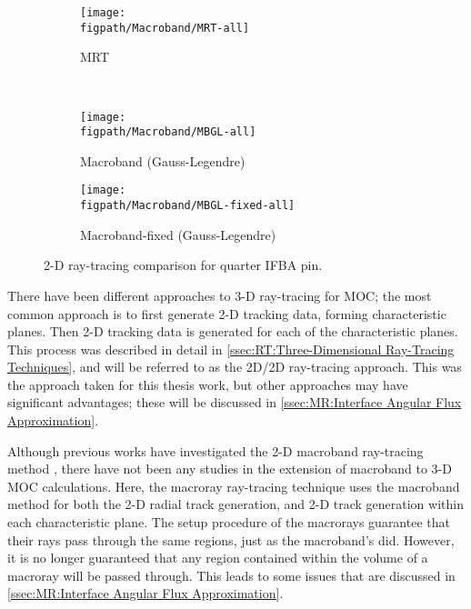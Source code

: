 {{{      \begin{figure}[htbp]
        \centering
        \begin{subfigure}[t]{0.49\textwidth}
          \centering
          \texttt{[image: \\figpath/Macroband/MRT-all]}
          \caption{MRT}
        \end{subfigure}%
        ~
        \begin{subfigure}[t]{0.49\textwidth}
          \centering
          \texttt{[image: \\figpath/Macroband/MBGL-all]}
          \caption{Macroband (Gauss-Legendre)}
        \end{subfigure}
        \begin{subfigure}[t]{0.49\textwidth}
          \centering
          \texttt{[image: \\figpath/Macroband/MBGL-fixed-all]}
          \caption{Macroband-fixed (Gauss-Legendre)}
        \end{subfigure}
        \caption{2-D ray-tracing comparison for quarter IFBA pin. \label{figs:MR:Macroband-All-Visualization}}
      \end{figure}
    }
    There have been different approaches to 3-D ray-tracing for \ac{MOC}; the most common approach is to first generate 2-D tracking data, forming characteristic planes.
    Then 2-D tracking data is generated for each of the characteristic planes.
    This process was described in detail in \cref{ssec:RT:Three-Dimensional Ray-Tracing Techniques}, and will be referred to as the 2D/2D ray-tracing approach.
    This was the approach taken for this thesis work, but other approaches may have significant advantages; these will be discussed in \cref{ssec:MR:Interface Angular Flux Approximation}.

    Although previous works have investigated the 2-D macroband ray-tracing method \cite{Yamamoto2005,Fevotte2007,Yamamoto2008}, there have not been any studies in the extension of macroband to 3-D \ac{MOC} calculations.
    Here, the macroray ray-tracing technique uses the macroband method for both the 2-D radial track generation, and 2-D track generation within each characteristic plane.
    The setup procedure of the macrorays guarantee that their rays pass through the same regions, just as the macroband's did.
    However, it is no longer guaranteed that any region contained within the volume of a macroray will be passed through.
    This leads to some issues that are discussed in \cref{ssec:MR:Interface Angular Flux Approximation}.

}}
